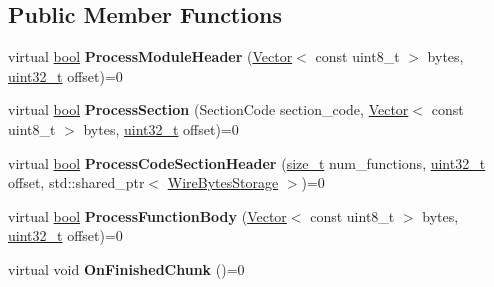 \subsection*{Public Member Functions}
\begin{DoxyCompactItemize}
\item 
\mbox{\label{classv8_1_1internal_1_1wasm_1_1StreamingProcessor_aaf544703fc073ef1d66d102c98584420}} 
virtual \mbox{\hyperlink{classbool}{bool}} {\bfseries Process\+Module\+Header} (\mbox{\hyperlink{classv8_1_1internal_1_1Vector}{Vector}}$<$ const uint8\+\_\+t $>$ bytes, \mbox{\hyperlink{classuint32__t}{uint32\+\_\+t}} offset)=0
\item 
\mbox{\label{classv8_1_1internal_1_1wasm_1_1StreamingProcessor_aed9de7605b356600fcbcc6b2a2ef5442}} 
virtual \mbox{\hyperlink{classbool}{bool}} {\bfseries Process\+Section} (Section\+Code section\+\_\+code, \mbox{\hyperlink{classv8_1_1internal_1_1Vector}{Vector}}$<$ const uint8\+\_\+t $>$ bytes, \mbox{\hyperlink{classuint32__t}{uint32\+\_\+t}} offset)=0
\item 
\mbox{\label{classv8_1_1internal_1_1wasm_1_1StreamingProcessor_a51a039a20e2cd88d5f5cd9dd369b92af}} 
virtual \mbox{\hyperlink{classbool}{bool}} {\bfseries Process\+Code\+Section\+Header} (\mbox{\hyperlink{classsize__t}{size\+\_\+t}} num\+\_\+functions, \mbox{\hyperlink{classuint32__t}{uint32\+\_\+t}} offset, std\+::shared\+\_\+ptr$<$ \mbox{\hyperlink{classv8_1_1internal_1_1wasm_1_1WireBytesStorage}{Wire\+Bytes\+Storage}} $>$)=0
\item 
\mbox{\label{classv8_1_1internal_1_1wasm_1_1StreamingProcessor_a1eb013f15afc707075217d4568155c7f}} 
virtual \mbox{\hyperlink{classbool}{bool}} {\bfseries Process\+Function\+Body} (\mbox{\hyperlink{classv8_1_1internal_1_1Vector}{Vector}}$<$ const uint8\+\_\+t $>$ bytes, \mbox{\hyperlink{classuint32__t}{uint32\+\_\+t}} offset)=0
\item 
\mbox{\label{classv8_1_1internal_1_1wasm_1_1StreamingProcessor_a63c3c428516c2fd39f1f8ca7f3048868}} 
virtual void {\bfseries On\+Finished\+Chunk} ()=0
\item 

\end{DoxyCompactItemize}
